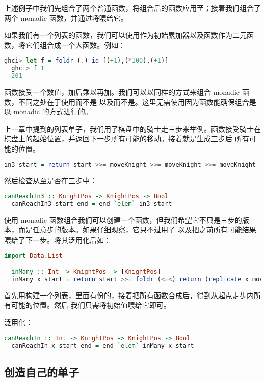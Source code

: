 \documentclass[./main.tex]{subfiles}
\begin{document}
上述例子中我们先组合了两个普通函数，将组合后的函数应用至；接着我们组合了两个 monadic 函数，并通过\acode{>>=}将喂给它。

如果我们有一个列表的函数，我们可以使用作为初始累加器以及函数作为二元函数，将它们组合成一个大函数。例如：

\begin{lstlisting}[language=Haskell]
  ghci> let f = foldr (.) id [(+1),(*100),(+1)]
  ghci> f 1
  201
\end{lstlisting}

函数接受一个数值，加后乘以再加。我们可以以同样的方式来组合 monadic 函数，不同之处在于使用\acode{<=<}而不是
以及而不是。这里无需使用因为\acode{<=<}函数能确保组合是以 monadic 的方式进行的。

上一章中提到的列表单子，我们用了棋盘中的骑士走三步来举例。函数接受骑士在棋盘上的起始位置，并返回下一步所有可能的移动。接着就是生成三步后
所有可能的位置。

\begin{lstlisting}[language=Haskell]
  in3 start = return start >>= moveKnight >>= moveKnight >>= moveKnight
\end{lstlisting}

然后检查从至是否在三步中：

\begin{lstlisting}[language=Haskell]
  canReachIn3 :: KnightPos -> KnightPos -> Bool
  canReachIn3 start end = end `elem` in3 start
\end{lstlisting}

使用 monadic 函数组合我们可以创建一个函数，但我们希望它不只是三步的版本，而是任意步的版本。如果仔细观察，它只不过用了\acode{>>=}
以及把之前所有可能结果喂给了下一步。将其泛用化后如：

\begin{lstlisting}[language=Haskell]
  import Data.List

  inMany :: Int -> KnightPos -> [KnightPos]
  inMany x start = return start >>= foldr (<=<) return (replicate x moveKnight)
\end{lstlisting}

首先用构建一个列表，里面有份的，接着把所有函数合成后，得到从起点走步内所有可能的位置。然后
我们只需将初始值喂给它即可。

泛用化：

\begin{lstlisting}[language=Haskell]
  canReachIn :: Int -> KnightPos -> KnightPos -> Bool
  canReachIn x start end = end `elem` inMany x start
\end{lstlisting}

\subsection*{创造自己的单子}

\end{document}
